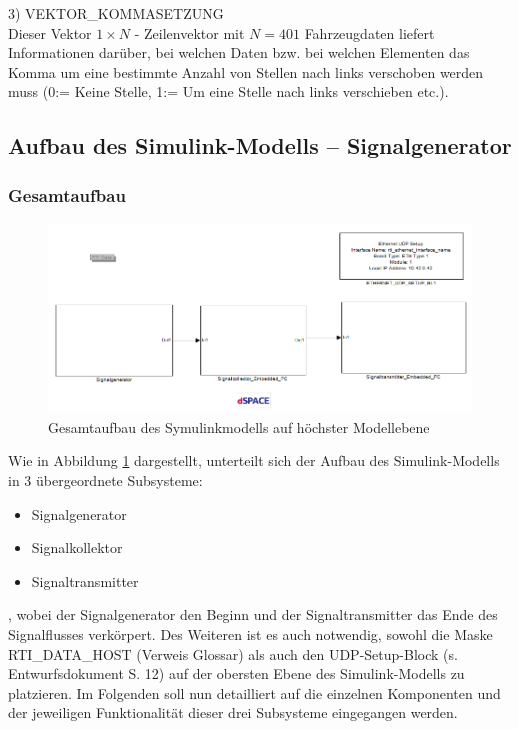 \documentclass[fontsize = 12pt, paper = a4]{scrreprt}
\begin{document}
3) VEKTOR\_KOMMASETZUNG \\

Dieser Vektor $1 \times N$ - Zeilenvektor mit $N = 401$ Fahrzeugdaten  liefert Informationen darüber, bei welchen Daten bzw. bei 
welchen Elementen das Komma um eine bestimmte Anzahl von Stellen nach links verschoben werden muss (0:= Keine Stelle, 1:= Um eine Stelle nach links verschieben etc.).


\subsection{Aufbau des Simulink-Modells -- Signalgenerator}

\subsubsection{Gesamtaufbau}

\begin{figure}[h]
\centering
\includegraphics[scale = 0.65]{topmodell}
\caption[Gesamtaufbau Simulink-Modell]{Gesamtaufbau des Symulinkmodells auf höchster Modellebene}
\label{topmodell}
\end{figure}

Wie in Abbildung \ref{topmodell} dargestellt, unterteilt sich der Aufbau des Simulink-Modells in 3 übergeordnete Subsysteme: 

\begin{itemize}

\item Signalgenerator
\item Signalkollektor
\item Signaltransmitter

\end{itemize}

, wobei der Signalgenerator den Beginn und der Signaltransmitter das Ende des Signalflusses verkörpert. Des Weiteren ist es auch notwendig, sowohl die Maske RTI\_DATA\_HOST (Verweis Glossar) als auch den UDP-Setup-Block (s. Entwurfsdokument S. 12) auf der obersten Ebene des Simulink-Modells zu platzieren. Im Folgenden soll nun detailliert auf die einzelnen Komponenten und der jeweiligen Funktionalität dieser drei Subsysteme eingegangen werden. 
\end{document}
